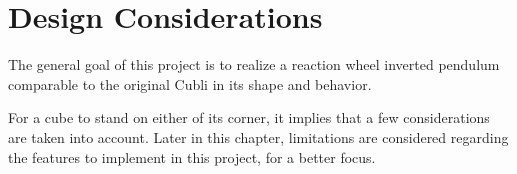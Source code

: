 \chapter{Design Considerations}\label{chap:designConsiderations}

The general goal of this project is to realize a reaction wheel inverted pendulum comparable to the original Cubli in its shape and behavior.

For a cube to stand on either of its corner, it implies that a few considerations are taken into account. Later in this chapter, limitations are considered regarding the features to implement in this project, for a better focus.





